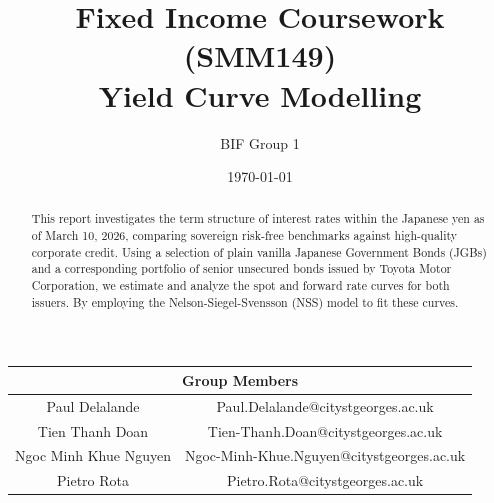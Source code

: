 \documentclass[11pt,oneside]{scrartcl}
\title{\vspace{-2em}Fixed Income Coursework (SMM149)\\\large Yield Curve Modelling}
\author{BIF Group 1}
\begin{document}
\date{\today}
\maketitle

\begin{center}
    \begin{tabular}{ | c | c | } 
        
        \hline
        \multicolumn{2}{|c|}{\textbf{Group Members}} \\ 
        \hline
        
        Paul Delalande & Paul.Delalande@citystgeorges.ac.uk \\ 
        \hline
        
        Tien Thanh Doan  & Tien-Thanh.Doan@citystgeorges.ac.uk  \\ 
        \hline
        
        Ngoc Minh Khue Nguyen  & Ngoc-Minh-Khue.Nguyen@citystgeorges.ac.uk  \\ 
        \hline
        
        Pietro Rota  & Pietro.Rota@citystgeorges.ac.uk  \\ 
        \hline
        
    \end{tabular}
\end{center}

\begin{abstract}
This report investigates the term structure of interest rates within the Japanese yen as of March 10, 2026, comparing sovereign risk-free benchmarks against high-quality corporate credit. Using a selection of plain vanilla Japanese Government Bonds (JGBs) and a corresponding portfolio of senior unsecured bonds issued by Toyota Motor Corporation, we estimate and analyze the spot and forward rate curves for both issuers. By employing the Nelson-Siegel-Svensson (NSS) model to fit these curves.
\end{abstract}
\end{document}
